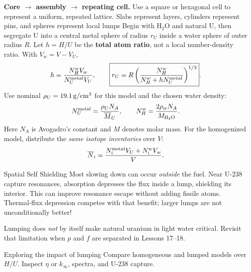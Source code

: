 \documentclass{ne630handout}
\begin{document}
\textbf{Core $\to$ assembly $\to$ repeating cell.} Use a square or hexagonal cell to represent a uniform, repeated lattice. Slabs represent layers, cylinders represent pins, and spheres represent local lumps
\colnext
{}
Begin with H$_2$O and natural U, then segregate U into a central metal sphere of radius $r_U$ inside a water sphere of outer radius $R$. Let $h=H/U$ be the \textbf{total atom ratio}, not a local number-density ratio. With $V_w=V-V_U$,
\[
 h=\frac{N_H^w V_w}{N_U^{\mathrm{metal}}V_U},\qquad
 \boxed{r_U=R\left(\frac{N_H^w}{N_H^w+hN_U^{\mathrm{metal}}}\right)^{1/3}}.
\]
Use nominal $\rho_U=19.1\,\mathrm{g/cm^3}$ for this model and the chosen water density:
\[
 N_U^{\mathrm{metal}}=\frac{\rho_U N_A}{\overline M_U},\qquad
 N_H^w=\frac{2\rho_wN_A}{M_{\mathrm{H_2O}}}.
\]
Here $N_A$ is Avogadro's constant and $M$ denotes molar mass. For the homogenized model, distribute the \emph{same isotope inventories} over $V$:
\[
 \overline N_i=\frac{N_i^{\mathrm{metal}}V_U+N_i^wV_w}{V}.
\]


\begin{KeyBox}{Spatial Self Shielding}
Most slowing down can occur {\it outside} the fuel. Near U-238 capture resonances, absorption depresses the flux inside a lump, shielding its interior. This can improve resonance escape without adding fissile atoms. Thermal-flux depression competes with that benefit; larger lumps are not unconditionally better!
\end{KeyBox}
Lumping does \emph{not} by itself make natural uranium in light water critical. Revisit that limitation when $p$ and $f$ are separated in Lessons 17--18.
\colend
\begin{OpenMCExplore}{Exploring the impact of lumping}
Compare homogeneous and lumped models over $H/U$. Inspect $\eta$ or $k_{\infty}$, spectra, and U-238 capture.
\end{OpenMCExplore}
\end{document}
